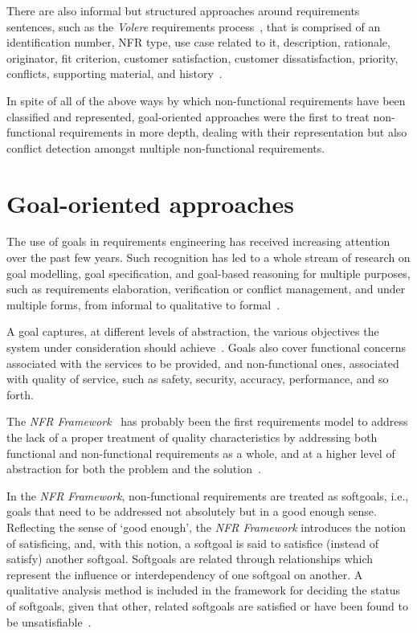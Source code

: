 \documentclass[dissertation,final]{softeng}
\newcommand{\nfrs}{non-functional requirements\xspace}
\begin{document}
{There are also informal but structured approaches around requirements sentences, such as the \emph{Volere} requirements process~\citep{Robertson:1999}, that is comprised of an identification number, NFR type, use case related to it, description, rationale, originator, fit criterion, customer satisfaction, customer dissatisfaction, priority, conflicts, supporting material, and history~\citep{Chung:2009vg}.

In spite of all of the above ways by which non-functional requirements have been classified and represented, goal-oriented approaches were the first to treat \nfrs in more depth, dealing with their representation but also conflict detection amongst multiple non-functional requirements. 

\section{Goal-oriented approaches}
The use of goals in requirements engineering has received increasing attention over the past few years. Such recognition has led to a whole stream of research on goal modelling, goal specification, and goal-based reasoning for multiple purposes, such as requirements elaboration, verification or conflict management, and under multiple forms, from informal to qualitative to formal~\citep{Lamsweerde:2001wpba}.

A goal captures, at different levels of abstraction, the various objectives the system under consideration should achieve~\citep{Lamsweerde:2001wpba}. Goals also cover functional concerns associated with the services to be provided, and non-functional ones, associated with quality of service, such as safety, security, accuracy, performance, and so forth.

The \emph{NFR Framework}~\citep{Chung2000} has probably been the first requirements model to address the lack of a proper treatment of quality characteristics by addressing both functional and non-functional requirements as a whole, and at a higher level of abstraction for both the problem and the solution~\citep{Chung:2009vg}.

In the \emph{NFR Framework}, non-functional requirements are treated as softgoals, i.e., goals that need to be addressed not absolutely but in a good enough sense. Reflecting the sense of `good enough', the \emph{NFR Framework} introduces the notion of satisficing, and, with this notion, a softgoal is said to satisfice (instead of satisfy) another softgoal. Softgoals are related through relationships which represent the influence or interdependency of one softgoal on another. A qualitative analysis method is included in the framework for deciding the status of softgoals, given that other, related softgoals are satisfied or have been found to be unsatisfiable~\citep{Chung2000}.

}
\end{document}
